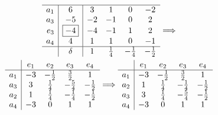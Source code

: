 \documentclass[a4paper, showtrims]{memoir}
\theoremstyle{plain}
\theoremstyle{remark}
\theoremstyle{definition}
\begin{document}
\begin{multline*}
\begin{array}{r|c|cccc}
		\hline
		a_1 & 6          & 3   & 1           & 0            & -2           \\
		a_3 & -5         & -2  & -1          & 0            & 2            \\
		e_3 & \boxed{-4} & -4  & -1          & 1            & 2            \\
		a_4 & 4          & 1   & 1           & 0            & -1           \\
		\hline
		    & \delta     & 1   & \frac{1}{4} & -\frac{1}{4} & -\frac{1}{2}
	\end{array}\Longrightarrow
	\\
	\begin{array}{r|cccc}
		    & e_1 & e_2          & e_3          & e_4          \\
		\hline
		a_1 & -3  & -\frac{1}{2} & \frac{3}{2}  & 1            \\
		a_3 & 3   & \frac{1}{4}  & -\frac{5}{4} & -\frac{1}{2} \\
		a_2 & 1   & \frac{1}{4}  & -\frac{1}{4} & -\frac{1}{2} \\
		a_4 & -3  & 0            & 1            & 1
	\end{array}\Longrightarrow
	\begin{array}{r|cccc}
		    & e_1 & e_2          & e_3          & e_4          \\
		\hline
		a_1 & -3  & -\frac{1}{2} & \frac{3}{2}  & 1            \\
		a_2 & 1   & \frac{1}{4}  & -\frac{1}{4} & -\frac{1}{2} \\
		a_3 & 3   & \frac{1}{4}  & -\frac{5}{4} & -\frac{1}{2} \\
		a_4 & -3  & 0            & 1            & 1
	\end{array}
\end{multline*}
\end{document}
